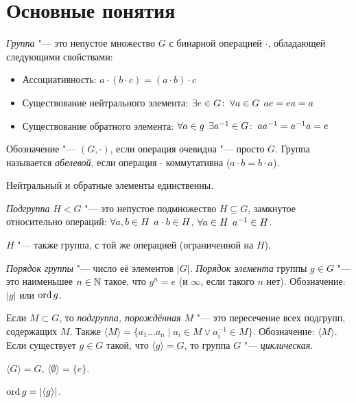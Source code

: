 \documentclass[main]{subfiles}
\begin{document}
\section{Основные понятия}
\begin{definition}
  \emph{Группа} "--- это непустое множество $G$
  с бинарной операцией $\cdot$,
  обладающей следующими свойствами:
  \begin{itemize}
    \item Ассоциативность:
      $a \cdot (b \cdot c) = (a \cdot b) \cdot c$
    \item Существование нейтрального элемента:
      $\exists e \in G \colon \: \forall {a \in G} \; \,
      ae = ea = a$
    \item Существование обратного элемента:
      $\forall {a \in g} \; \, \exists a^{-1} \in G \colon \:
      aa^{-1} = a^{-1}a = e$
  \end{itemize}
  Обозначение "--- $(G, \cdot)$,
  если операция очевидна "--- просто $G$.
  Группа называется \emph{абелевой},
  если операция \( \cdot \) коммутативна
  ($a \cdot b = b \cdot a$).
\end{definition}
\begin{remark}
  Нейтральный и обратные элементы единственны.
\end{remark}

\begin{definition}
  \emph{Подгруппа} $H < G$ "---
  это непустое подмножество $H \subseteq G$,
  замкнутое относительно операций:
  \( \forall {a, b \in H} \; \, a \cdot b \in H \),
  \( \forall {a \in H} \; \, a^{-1} \in H \).
\end{definition}
\begin{remark}
  $H$ "--- также группа, с той же операцией
  (ограниченной на \( H \)).
\end{remark}

\begin{definition}
  \emph{Порядок группы} "--- число её элементов $|G|$.
  \emph{Порядок элемента} группы $g \in G$ "---
  это наименьшее $n \in \mathbb{N}$ такое,
  что $g^n = e$ (и $\infty$, если такого $n$ нет).
  Обозначение: $|g|$ или $\operatorname{ord} g$.
\end{definition}

\begin{definition}
  Если $M \subset G$, то \emph{подгруппа, порождённая $M$} "---
  это пересечение всех подгрупп, содержащих $M$.
  Также $\langle M \rangle = \{ a_1 \dots a_n \mid
  a_i \in M \lor a_i^{-1} \in M \}$.
  Обозначение: $\langle M \rangle $.
  Если существует \( g \in G \) такой, что
  \( \langle g \rangle = G \),
  то группа \( G \) "--- \emph{циклическая}.
\end{definition}
\begin{example}
  $\langle G \rangle = G$, $\langle \emptyset \rangle = \{ e \}$.
\end{example}
\begin{remark}
  $\operatorname{ord} g = |\langle g \rangle|$.
\end{remark}
\end{document}
